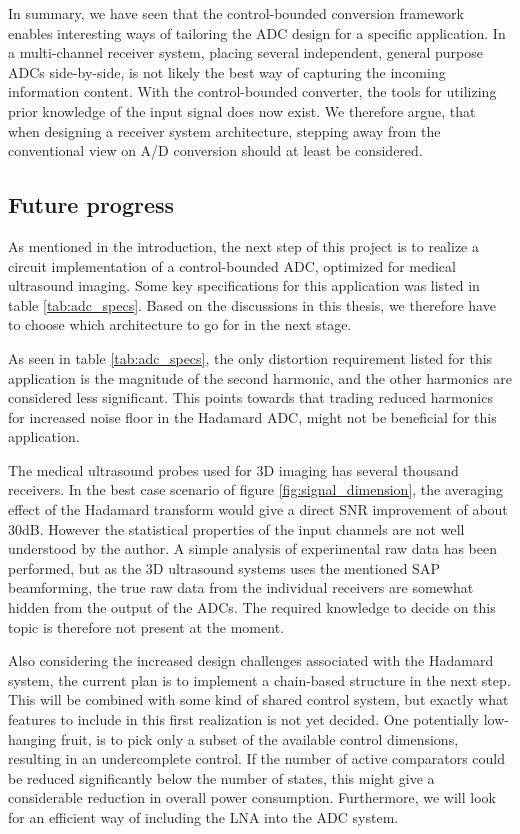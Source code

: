 In summary, we have seen that the control-bounded conversion framework enables interesting ways of tailoring the ADC design for a specific application. In a multi-channel receiver system, placing several independent, general purpose ADCs side-by-side, is not likely the best way of capturing the incoming information content. With the control-bounded converter, the tools for utilizing prior knowledge of the input signal does now exist. We therefore argue, that when designing a receiver system architecture, stepping away from the conventional view on A/D conversion should at least be considered.


\subsection*{Future progress}
As mentioned in the introduction, the next step of this project is to realize a circuit implementation of a control-bounded ADC, optimized for medical ultrasound imaging. Some key specifications for this application was listed in table \ref{tab:adc_specs}. Based on the discussions in this thesis, we therefore have to choose which architecture to go for in the next stage.

As seen in table \ref{tab:adc_specs}, the only distortion requirement listed for this application is the magnitude of the second harmonic, and the other harmonics are considered less significant. This points towards that trading reduced harmonics for increased noise floor in the Hadamard ADC, might not be beneficial for this application.

The medical ultrasound probes used for 3D imaging has several thousand receivers. In the best case scenario of figure \ref{fig:signal_dimension}, the averaging effect of the Hadamard transform would give a direct SNR improvement of about 30dB. However the statistical properties of the input channels are not well understood by the author. A simple analysis of experimental raw data has been performed, but as the 3D ultrasound systems uses the mentioned SAP beamforming, the true raw data from the individual receivers are somewhat hidden from the output of the ADCs. The required knowledge to decide on this topic is therefore not present at the moment.

Also considering the increased design challenges associated with the Hadamard system, the current plan is to implement a chain-based structure in the next step. This will be combined with some kind of shared control system, but exactly what features to include in this first realization is not yet decided. One potentially low-hanging fruit, is to pick only a subset of the available control dimensions, resulting in an undercomplete control. If the number of active comparators could be reduced significantly below the number of states, this might give a considerable reduction in overall power consumption. Furthermore, we will look for an efficient way of including the LNA into the ADC system.

